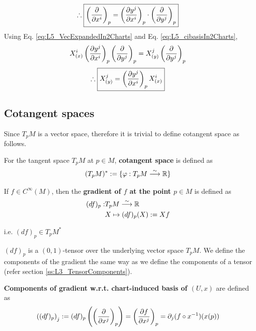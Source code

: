 \begin{equation}\label{eq:L5_cibasisIn2Charts}
\therefore \boxed{\left(\cibasis{x^i}\right)_p = \left(\cibasis[y^j]{x^i}\right)_p \cdot \left(\cibasis{y^j}\right)_p}
\end{equation}
Using Eq. \ref{eq:L5_VecExpandedIn2Charts} and Eq. \ref{eq:L5_cibasisIn2Charts}, 
\[
  X^i_{(x)} \left(\cibasis[y^j]{x^i}\right)_p \left(\cibasis{y^j}\right)_p = X^j_{(y)}\left(\cibasis{y^j}\right)_p
\]
\begin{equation}
\therefore \boxed{X^j_{(y)} = \left(\cibasis[y^j]{x^i}\right)_p X^i_{(x)}}
\end{equation}

\subsection{Cotangent spaces}
Since $T_pM$ is a vector space, therefore it is trivial to define cotangent space as follows.

\begin{definition}
For the tangent space $T_pM$ at $p \in M$, \textbf{cotangent space} is defined as
\begin{equation}
(T_pM)^* := \lbrace \varphi : T_pM \linearmapto \R \rbrace
\end{equation}
\end{definition}

\begin{definition}
\label{def:gradient}
If $f \in C^{\infty}(M)$, then the \textbf{gradient of $f$ at the point $p \in M$} is defined as
\begin{align}
\label{eq:defGradient}
  (df)_p : & T_p M \linearmapto \R \nonumber \\ 
  & X \mapsto (df)_p(X) := Xf
\end{align}

\end{definition}
i.e. $\boxed{(df)_p \in T_pM^*}$

$(df)_p$ is a $(0,1)$-tensor over the underlying vector space $T_pM$. We define the components of the gradient the same way as we define the components of a tensor (refer section \ref{ss:L3_TensorComponents}).

\begin{definition}
\textbf{Components of gradient w.r.t. chart-induced basis of $(U,x)$} are defined as
\begin{equation}
\left((df)_p \right)_j := (df)_p\left(\left(\cibasis{x^j}\right)_p \right) = \left(\cibasis[f]{x^j}\right)_p = \partial_j (f \after x^{-1})(x(p))
\end{equation}
\end{definition}

